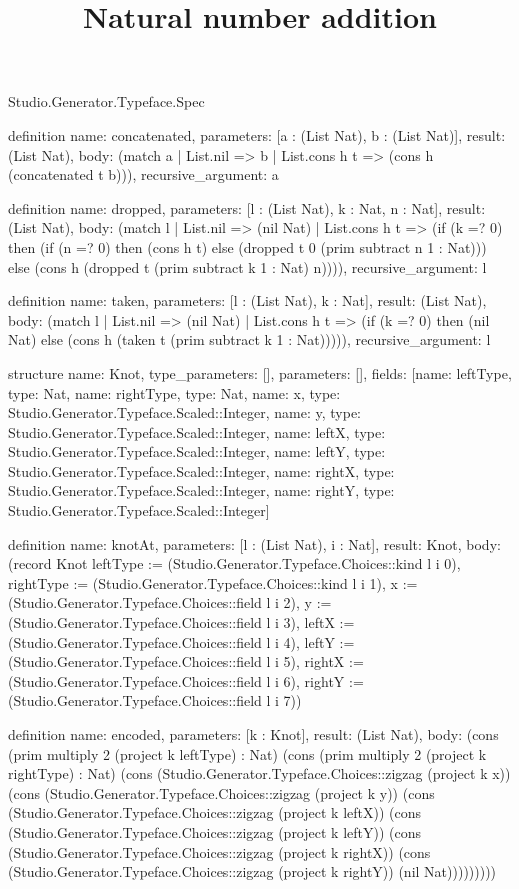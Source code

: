 \begin{lexlean}{Studio.Generator.Typeface.Spec}
\title{Natural number addition}
\begin{semanticmodule}
definition{
  name: concatenated,
  parameters: [a : (List Nat), b : (List Nat)],
  result: (List Nat),
  body: (match a
    | List.nil => b
    | List.cons h t => (cons h (concatenated t b))),
  recursive_argument: a
}

definition{
  name: dropped,
  parameters: [l : (List Nat), k : Nat, n : Nat],
  result: (List Nat),
  body: (match l
    | List.nil => (nil Nat)
    | List.cons h t => (if (k =? 0) then (if (n =? 0) then (cons h t) else (dropped t 0 (prim subtract n 1 : Nat))) else (cons h (dropped t (prim subtract k 1 : Nat) n)))),
  recursive_argument: l
}

definition{
  name: taken,
  parameters: [l : (List Nat), k : Nat],
  result: (List Nat),
  body: (match l
    | List.nil => (nil Nat)
    | List.cons h t => (if (k =? 0) then (nil Nat) else (cons h (taken t (prim subtract k 1 : Nat))))),
  recursive_argument: l
}

structure{
  name: Knot,
  type_parameters: [],
  parameters: [],
  fields: [{name: leftType, type: Nat}, {name: rightType, type: Nat}, {name: x, type: Studio.Generator.Typeface.Scaled::Integer}, {name: y, type: Studio.Generator.Typeface.Scaled::Integer}, {name: leftX, type: Studio.Generator.Typeface.Scaled::Integer}, {name: leftY, type: Studio.Generator.Typeface.Scaled::Integer}, {name: rightX, type: Studio.Generator.Typeface.Scaled::Integer}, {name: rightY, type: Studio.Generator.Typeface.Scaled::Integer}]
}

definition{
  name: knotAt,
  parameters: [l : (List Nat), i : Nat],
  result: Knot,
  body: (record Knot {leftType := (Studio.Generator.Typeface.Choices::kind l i 0), rightType := (Studio.Generator.Typeface.Choices::kind l i 1), x := (Studio.Generator.Typeface.Choices::field l i 2), y := (Studio.Generator.Typeface.Choices::field l i 3), leftX := (Studio.Generator.Typeface.Choices::field l i 4), leftY := (Studio.Generator.Typeface.Choices::field l i 5), rightX := (Studio.Generator.Typeface.Choices::field l i 6), rightY := (Studio.Generator.Typeface.Choices::field l i 7)})
}

definition{
  name: encoded,
  parameters: [k : Knot],
  result: (List Nat),
  body: (cons (prim multiply 2 (project k leftType) : Nat) (cons (prim multiply 2 (project k rightType) : Nat) (cons (Studio.Generator.Typeface.Choices::zigzag (project k x)) (cons (Studio.Generator.Typeface.Choices::zigzag (project k y)) (cons (Studio.Generator.Typeface.Choices::zigzag (project k leftX)) (cons (Studio.Generator.Typeface.Choices::zigzag (project k leftY)) (cons (Studio.Generator.Typeface.Choices::zigzag (project k rightX)) (cons (Studio.Generator.Typeface.Choices::zigzag (project k rightY)) (nil Nat)))))))))
}


\end{semanticmodule}
\end{lexlean}
